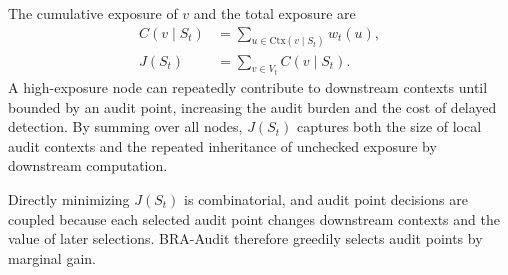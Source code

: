 \documentclass[letterpaper]{article} %
\begin{document}
The cumulative exposure of \(v\) and the total exposure are
\begin{equation}
\begin{aligned}
C(v\mid S_t)
&=
\sum_{u\in\mathrm{Ctx}(v\mid S_t)}w_t(u),\\
J(S_t)
&=
\sum_{v\in V_t}C(v\mid S_t).
\end{aligned}
\end{equation}
A high-exposure node can repeatedly contribute to downstream
contexts until bounded by an audit point, increasing the audit
burden and the cost of delayed detection. By summing over all
nodes, \(J(S_t)\) captures both the size of local audit contexts
and the repeated inheritance of unchecked exposure by
downstream computation.

Directly minimizing \(J(S_t)\) is combinatorial, and
audit point decisions are coupled because each selected
audit point changes downstream contexts and the value of
later selections. BRA-Audit therefore greedily selects
audit points by marginal gain.
\end{document}
